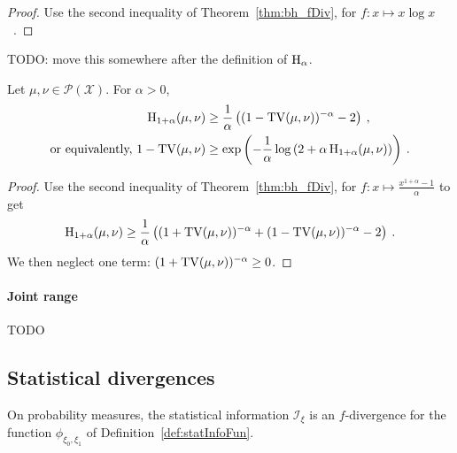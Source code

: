 \begin{proof}%
{}
Use the second inequality of Theorem~\ref{thm:bh_fDiv}, for $f: x \mapsto x \log x$~.
\end{proof}

\begin{corollary}
  \label{cor:cor:bh_hellingerAlpha}
  TODO: move this somewhere after the definition of $\operatorname{H}_\alpha$.

  Let $\mu, \nu \in \mathcal P(\mathcal X)$. For $\alpha > 0$,
  \begin{align*}
  \operatorname{H}_{1+\alpha}(\mu, \nu)
  &\ge \frac{1}{\alpha} \left( (1 - \operatorname{TV}(\mu, \nu))^{-\alpha} - 2 \right)
  \: , \\
  \text{or equivalently, }
  1 - \operatorname{TV}(\mu, \nu)
  &\ge \exp\left(-\frac{1}{\alpha} \log \left( 2 + \alpha \operatorname{H}_{1+\alpha}(\mu, \nu) \right)\right)
  \: .
  \end{align*}
\end{corollary}

\begin{proof}%
{}
Use the second inequality of Theorem~\ref{thm:bh_fDiv}, for $f: x \mapsto \frac{x^{1+\alpha} - 1}{\alpha}$ to get
\begin{align*}
\operatorname{H}_{1+\alpha}(\mu, \nu) \ge \frac{1}{\alpha} \left((1 + \operatorname{TV}(\mu, \nu))^{-\alpha} + (1 - \operatorname{TV}(\mu, \nu))^{-\alpha} - 2 \right) \: .
\end{align*}
We then neglect one term: $(1 + \operatorname{TV}(\mu, \nu))^{-\alpha} \ge 0$.
\end{proof}


\paragraph{Joint range}

TODO \cite{harremoes2011pairs}


\subsection{Statistical divergences}

\begin{lemma}
  \label{lem:statInfo_eq_fDiv}
  On probability measures, the statistical information $\mathcal I_\xi$ is an $f$-divergence for the function $\phi_{\xi_0, \xi_1}$ of Definition~\ref{def:statInfoFun}.
\end{lemma}

